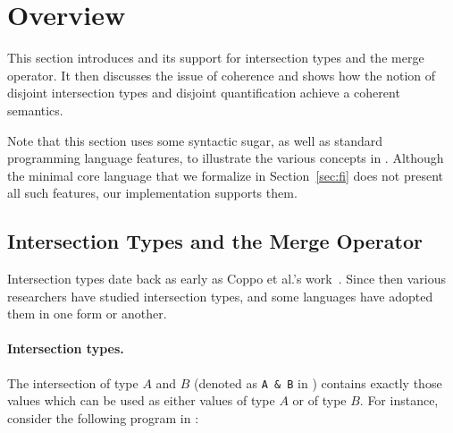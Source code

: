 \section{Overview} \label{sec:overview}

This section introduces \namedis and its support for intersection types and the
merge operator. It then discusses the issue of coherence and shows how the
notion of disjoint intersection types and disjoint quantification achieve a
coherent semantics.


Note that this section uses some syntactic sugar, as well as standard
programming language features, to illustrate the various concepts in
\namedis. Although the minimal core language that we formalize in
Section~\ref{sec:fi} does not present all such features, our implementation
supports them.


\begin{comment}
It then shows that,
with unrestricted intersection types, the system
lacks \emph{coherence}. This motivates the introduction of
disjoint intersection types and extending universal quantification to
disjoint quantification, which is enough to ensure coherence.
\end{comment}

\subsection{Intersection Types and the Merge Operator}

Intersection types date back as early as Coppo et
al.'s work~\cite{coppo1981functional}. Since then various researchers have
studied intersection types, and some languages have adopted them in one
form or another.

\paragraph{Intersection types.}
The intersection of type $A$ and $B$ (denoted as \lstinline{A & B} in
\namedis) contains exactly those values
which can be used as either values of type $A$ or of type $B$. For instance,
consider the following program in \namedis:

